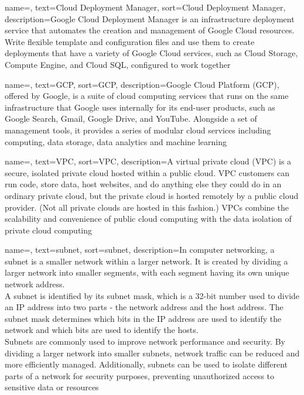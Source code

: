 {
    name=,
    text=Cloud Deployment Manager,
    sort=Cloud Deployment Manager,
    description={Google Cloud Deployment Manager is an infrastructure deployment service that automates the creation and management of Google Cloud resources. Write flexible template and configuration files and use them to create deployments that have a variety of Google Cloud services, such as Cloud Storage, Compute Engine, and Cloud SQL, configured to work together}
}

{
    name=,
    text=GCP,
    sort=GCP,
    description={Google Cloud Platform (GCP), offered by Google, is a suite of cloud computing services that runs on the same infrastructure that Google uses internally for its end-user products, such as Google Search, Gmail, Google Drive, and YouTube. Alongside a set of management tools, it provides a series of modular cloud services including computing, data storage, data analytics and machine learning}
}

{
    name=,
    text=VPC,
    sort=VPC,
    description={A virtual private cloud (VPC) is a secure, isolated private cloud hosted within a public cloud. VPC customers can run code, store data, host websites, and do anything else they could do in an ordinary private cloud, but the private cloud is hosted remotely by a public cloud provider. (Not all private clouds are hosted in this fashion.) VPCs combine the scalability and convenience of public cloud computing with the data isolation of private cloud computing}
}

{
    name=,
    text=subnet,
    sort=subnet,
    description={In computer networking, a subnet is a smaller network within a larger network. It is created by dividing a larger network into smaller segments, with each segment having its own unique network address.\\
    A subnet is identified by its subnet mask, which is a 32-bit number used to divide an IP address into two parts - the network address and the host address. The subnet mask determines which bits in the IP address are used to identify the network and which bits are used to identify the hosts.\\
    Subnets are commonly used to improve network performance and security. By dividing a larger network into smaller subnets, network traffic can be reduced and more efficiently managed. Additionally, subnets can be used to isolate different parts of a network for security purposes, preventing unauthorized access to sensitive data or resources}
}

